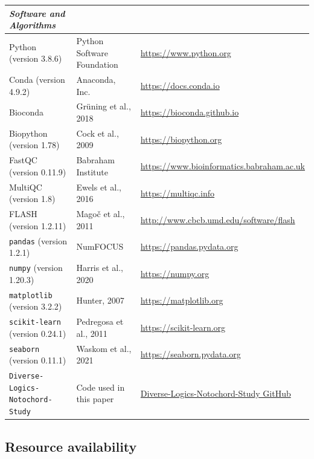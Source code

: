 \begin{landscape}
\begin{longtable}{p{} p{} p{}}
        \hline \textit{Software and Algorithms} \\ \hline
        Python (version 3.8.6)  & Python Software Foundation & \href{https://www.python.org}{https://www.python.org} \\
        Conda (version 4.9.2) & Anaconda, Inc. & \href{https://docs.conda.io/}{https://docs.conda.io} \\
        Bioconda  & Grüning et al., 2018 & \href{https://bioconda.github.io}{https://bioconda.github.io} \\
        Biopython (version 1.78) & Cock et al., 2009 & \href{https://biopython.org}{https://biopython.org} \\
        FastQC (version 0.11.9)	& Babraham Institute & \href{https://www.bioinformatics.babraham.ac.uk/}{https://www.bioinformatics.babraham.ac.uk} \\
        MultiQC (version 1.8) & Ewels et al., 2016 & \href{https://multiqc.info}{https://multiqc.info} \\
        FLASH (version 1.2.11) & Magoč et al., 2011 & \href{http://www.cbcb.umd.edu/software/flash}{http://www.cbcb.umd.edu/software/flash} \\
        \verb|pandas| (version 1.2.1) & NumFOCUS & \href{https://pandas.pydata.org}{https://pandas.pydata.org} \\
        \verb|numpy| (version 1.20.3) & Harris et al., 2020 & \href{https://numpy.org}{https://numpy.org} \\
        \verb|matplotlib| (version 3.2.2) & Hunter, 2007 & \href{https://matplotlib.org/}{https://matplotlib.org} \\
        \verb|scikit-learn| (version 0.24.1) & Pedregosa et al., 2011 & \href{https://scikit-learn.org/}{https://scikit-learn.org} \\
        \verb|seaborn| (version 0.11.1) & Waskom et al., 2021 & \href{https://seaborn.pydata.org/}{https://seaborn.pydata.org} \\
        \verb|Diverse-Logics-Notochord-Study| & Code used in this paper & \href{https://github.com/farleylab/Diverse-Logics-Notochord-Study}{Diverse-Logics-Notochord-Study GitHub} \\
    \end{longtable}
\end{landscape}

\subsection{Resource availability}


